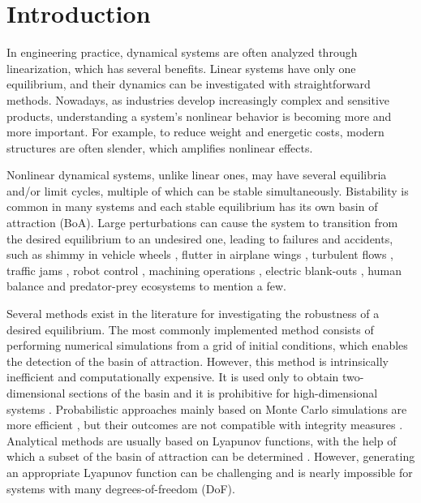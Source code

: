 \documentclass[preprint,12pt]{elsarticle}
\begin{document}
	
	
	\section{Introduction}
	
	In engineering practice, dynamical systems are often analyzed through linearization, which has several benefits. Linear systems have only one equilibrium, and their dynamics can be investigated with straightforward methods. Nowadays, as industries develop increasingly complex and sensitive products,  understanding a system's nonlinear behavior is becoming more and more important. For example, to reduce weight and energetic costs, modern structures are often slender, which amplifies nonlinear effects.
	
	Nonlinear dynamical systems, unlike linear ones, may have several equilibria and/or limit cycles, multiple of which can be stable simultaneously. Bistability is common in many systems and each stable equilibrium has its own basin of attraction (BoA). Large perturbations can cause the system to transition from the desired equilibrium to an undesired one, leading to failures and accidents, such as shimmy in vehicle wheels \cite{pacejka1965analysis,beregi2019bifurcation,horvath2022stability,habib2023towed}, flutter in airplane wings \cite{lind2003flight,verstraelen2017experimental,basta2021flutter,takarics2020active,drachinsky2022flutter}, turbulent flows \cite{kerswell2018nonlinear,cherubini2015nonlinear}, traffic jams \cite{nagatani2002physics,orosz2010traffic,molnar2021delayed}, 
	robot control \cite{veraszto2017nonlinear,szaksz2022transient,habib2022bistability,bartfai2022hopf}, machining operations \cite{dombovari2015bistable,molnar2019closed,iklodi2022bi}, electric blank-outs \cite{pourbeik2006anatomy,gajduk2014stability}, human balance \cite{smith2017basins,zakynthinaki2010modeling} and predator-prey ecosystems \cite{aguirre2014bifurcations,arancibia2019basins} to mention a few.
	
	Several methods exist in the literature for investigating the robustness of a desired equilibrium.  The most commonly implemented method consists of performing numerical simulations from a grid of initial conditions, which enables the detection of the basin of attraction. However, this method is intrinsically inefficient and computationally expensive. It is used only to obtain two-dimensional sections of the basin and it is prohibitive for high-dimensional systems \cite{rega2021global}. Probabilistic approaches mainly based on Monte Carlo simulations are more efficient \cite{martiniani2016structural,sprott2015classifying,yan2021statistical}, but their outcomes are not compatible with integrity measures \cite{lenci2019global}. Analytical methods are usually based on Lyapunov functions, with the help of which a subset of the basin of attraction can be determined \cite{ratschan2010providing,grinberg2015boundary,biemond2014estimation}. However, generating an appropriate Lyapunov function can be challenging and is nearly impossible for systems with many degrees-of-freedom (DoF).
	
\end{document}

